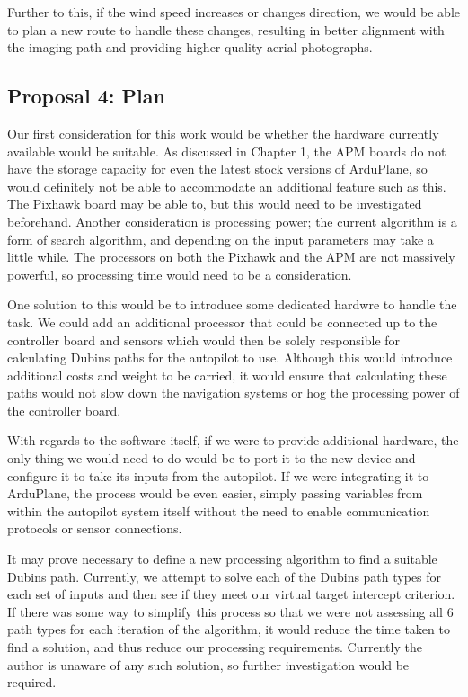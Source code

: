 Further to this, if the wind speed increases or changes direction, we would be able to plan a new route to handle these changes, resulting in better alignment with the imaging path and providing higher quality aerial photographs. 

\subsection{Proposal 4: Plan} 
\label{future:onboardplan}

Our first consideration for this work would be whether the hardware currently available would be suitable. As discussed in Chapter 1, the APM boards do not have the storage capacity for even the latest stock versions of ArduPlane, so would definitely not be able to accommodate an additional feature such as this. The Pixhawk board may be able to, but this would need to be investigated beforehand. Another consideration is processing power; the current algorithm is a form of search algorithm, and depending on the input parameters may take a little while. The processors on both the Pixhawk and the APM are not massively powerful, so processing time would need to be a consideration. 

One solution to this would be to introduce some dedicated hardwre to handle the task. We could add an additional processor that could be connected up to the controller board and sensors which would then be solely responsible for calculating Dubins paths for the autopilot to use. Although this would introduce additional costs and weight to be carried, it would ensure that calculating these paths would not slow down the navigation systems or hog the processing power of the controller board.

With regards to the software itself, if we were to provide additional hardware, the only thing we would need to do would be to port it to the new device and configure it to take its inputs from the autopilot. If we were integrating it to ArduPlane, the process would be even easier, simply passing variables from within the autopilot system itself without the need to enable communication protocols or sensor connections. 

It may prove necessary to define a new processing algorithm to find a suitable Dubins path. Currently, we attempt to solve each of the Dubins path types for each set of inputs and then see if they meet our virtual target intercept criterion. If there was some way to simplify this process so that we were not assessing all 6 path types for each iteration of the algorithm, it would reduce the time taken to find a solution, and thus reduce our processing requirements. Currently the author is unaware of any such solution, so further investigation would be required.

